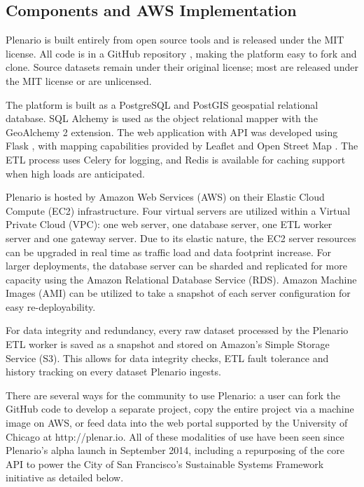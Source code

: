 \documentclass[11pt]{article}
\begin{document}
\subsection{Components and AWS Implementation}
Plenario is built entirely from open source tools and is released under the MIT license. All code is in a GitHub repository \cite{plenario-github}, making the platform easy to fork and clone. Source datasets remain under their original license; most are released under the MIT license or are unlicensed. 

The platform is built as a PostgreSQL and PostGIS geospatial relational database. SQL Alchemy \cite{sqlalchemy} is used as the object relational mapper with the GeoAlchemy 2 extension. The web application with API was developed using Flask \cite{flask}, with mapping capabilities provided by Leaflet \cite{leaflet} and Open Street Map \cite{openstreetmap}. The ETL process uses Celery \cite{celery} for logging, and Redis \cite{redis} is available for caching support when high loads are anticipated. 

Plenario is hosted by Amazon Web Services (AWS) on their Elastic Cloud Compute (EC2) infrastructure. Four virtual servers are utilized within a Virtual Private Cloud (VPC): one web server, one database server, one ETL worker server and one gateway server. Due to its elastic nature, the EC2 server resources can be upgraded in real time as traffic load and data footprint increase. For larger deployments, the database server can be sharded and replicated for more capacity using the Amazon Relational Database Service (RDS). Amazon Machine Images (AMI) can be utilized to take a snapshot of each server configuration for easy re-deployability.

For data integrity and redundancy, every raw dataset processed by the Plenario ETL worker is saved as a snapshot and stored on Amazon's Simple Storage Service (S3). This allows for data integrity checks, ETL fault tolerance and history tracking on every dataset Plenario ingests.

There are several ways for the community to use Plenario: a user can fork the GitHub code to develop a separate project, copy the entire project via a machine image on AWS, or feed data into the web portal supported by the University of Chicago at http://plenar.io. All of these modalities of use have been seen since Plenario's alpha launch in September 2014, including a repurposing of the core API to power the City of San Francisco's Sustainable Systems Framework initiative as detailed below. 
\end{document}
